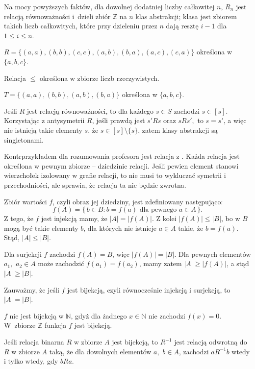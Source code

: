 Na mocy powyższych faktów, dla dowolnej dodatniej liczby całkowitej $n$, $R_n$ jest relacją równoważności i~dzieli zbiór $\mathbb{Z}$ na $n$ klas abstrakcji;  klasa jest zbiorem takich liczb całkowitych, które przy dzieleniu przez $n$ dają resztę $i-1$ dla $1\le i\le n$.

\exercise{} %
\subexercise{}
$R=\bigl\{(a,a),(b,b),(c,c),(a,b),(b,a),(a,c),(c,a)\bigr\}$ określona w $\{a,b,c\}$.

\subexercise{}
Relacja $\le$ określona w zbiorze liczb rzeczywistych.

\subexercise{}
$T=\bigl\{(a,a),(b,b),(a,b),(b,a)\bigr\}$ określona w $\{a,b,c\}$.

\exercise{} %
Jeśli $R$ jest relacją równoważności, to dla każdego $s\in S$ zachodzi $s\in[s]$. Korzystając z antysymetrii $R$, jeśli prawdą jest $s'Rs$ oraz $sRs',$ to $s=s'$, a więc nie istnieją takie elementy $s$, że $s\in[s]\setminus\{s\}$, zatem klasy abstrakcji są singletonami.

\exercise{} %
Kontrprzykładem dla rozumowania profesora jest relacja z . Każda relacja jest określona w pewnym zbiorze -- dziedzinie relacji. Jeśli pewien element stanowi wierzchołek izolowany w grafie relacji, to nie musi to wykluczać symetrii i przechodniości, ale sprawia, że relacja ta nie będzie zwrotna.


\exercise{} %
\subexercise{}
Zbiór wartości $f$, czyli obraz jej dziedziny, jest zdefiniowany następująco:
\[
	f(A) = \bigl\{\,b\in B:b=f(a)\text{ dla pewnego $a\in A$}\,\bigr\}.
\]
Z tego, że $f$ jest injekcją mamy, że $|A|=|f(A)|$. Z kolei $|f(A)|\le|B|$, bo w $B$ mogą być takie elementy $b$, dla których nie istnieje $a\in A$ takie, że $b=f(a)$. Stąd, $|A|\le|B|$.

\subexercise{}
Dla surjekcji $f$ zachodzi $f(A)=B$, więc $|f(A)|=|B|$. Dla pewnych elementów $a_1$,~$a_2\in A$ może zachodzić $f(a_1)=f(a_2)$, mamy zatem $|A|\ge|f(A)|$, a stąd $|A|\ge|B|$.

Zauważmy, że jeśli $f$ jest bijekcją, czyli równocześnie injekcją i surjekcją, to $|A|=|B|$.

\exercise{} %
$f$ nie jest bijekcją w $\mathbb{N}$, gdyż dla żadnego $x\in\mathbb{N}$ nie zachodzi $f(x)=0$. W~zbiorze $\mathbb{Z}$ funkcja $f$ jest bijekcją.

\exercise{} %
Jeśli relacja binarna $R$ w zbiorze $A$ jest bijekcją, to $R^{-1}$ jest relacją odwrotną do $R$ w zbiorze $A$ taką, że dla dowolnych elementów $a$,~$b\in A$, zachodzi $aR^{-1}b$ wtedy i tylko wtedy, gdy $bRa$.

